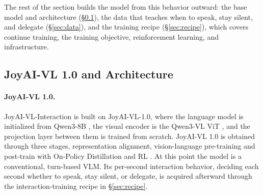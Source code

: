 \documentclass{llmxive}
\begin{document}



The rest of the section builds the model from this behavior outward: the base model and architecture (\S\ref{sec:arch}), the data that teaches when to speak, stay silent, and delegate (\S\ref{sec:data}), and the training recipe (\S\ref{sec:recipe}), which covers continue training, the training objective, reinforcement learning, and infrastructure.




\subsection{JoyAI-VL 1.0 and Architecture}
\label{sec:arch}



\paragraph{\textbf{JoyAI-VL 1.0.}}
JoyAI-VL-Interaction is built on JoyAI-VL-1.0, %
where the language model is initialized from Qwen3-8B \cite{yang2025qwen3technicalreport}, the visual encoder is the Qwen3-VL ViT \cite{bai2025qwen3vltechnicalreport}, and the projection layer between them is trained from scratch. JoyAI-VL 1.0 is obtained through three stages, representation alignment, vision-language pre-training and post-train with On-Policy Distillation \cite{lu2025onpolicydistillation} and RL \cite{liu2026gdpogrouprewarddecouplednormalization,shao2024deepseekmathpushinglimitsmathematical}. At this point the model is a conventional, turn-based VLM. Its per-second interaction behavior, deciding each second whether to speak, stay silent, or delegate, is acquired afterward through the interaction-training recipe in \S\ref{sec:recipe}.
\end{document}
